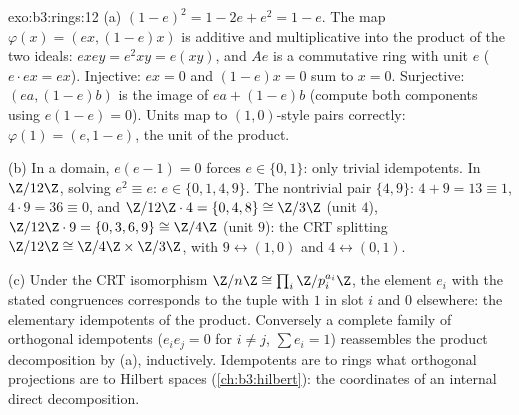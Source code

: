 \begin{solution}{exo:b3:rings:12}
(a) $(1-e)^2 = 1 - 2e + e^2 = 1 - e$. The map $\varphi(x) =
(ex, (1-e)x)$ is additive and multiplicative into the product
of the two ideals: $exey = e^2xy = e(xy)$, and $Ae$ is a
commutative ring with unit $e$ ($e\cdot ex = ex$). Injective:
$ex = 0$ and $(1-e)x = 0$ sum to $x = 0$. Surjective: $(ea,
(1-e)b)$ is the image of $ea + (1-e)b$ (compute both
components using $e(1-e) = 0$). Units map to $(1, 0)$-style
pairs correctly: $\varphi(1) = (e, 1-e)$, the unit of the
product.

(b) In a domain, $e(e - 1) = 0$ forces $e \in \{0, 1\}$: only
trivial idempotents. In $\Z/12\Z$, solving $e^2 \equiv e$: $e
\in \{0, 1, 4, 9\}$. The nontrivial pair $\{4, 9\}$: $4 + 9 =
13 \equiv 1$, $4\cdot9 = 36 \equiv 0$, and $\Z/12\Z\cdot4 =
\{0, 4, 8\} \cong \Z/3\Z$ (unit $4$), $\Z/12\Z\cdot9 = \{0,
3, 6, 9\} \cong \Z/4\Z$ (unit $9$): the CRT splitting
$\Z/12\Z \cong \Z/4\Z\times\Z/3\Z$, with $9 \leftrightarrow
(1, 0)$ and $4 \leftrightarrow (0, 1)$.

(c) Under the CRT isomorphism $\Z/n\Z \cong \prod_i
\Z/p_i^{a_i}\Z$, the element $e_i$ with the stated
congruences corresponds to the tuple with $1$ in slot $i$ and
$0$ elsewhere: the elementary idempotents of the product.
Conversely a complete family of orthogonal idempotents
($e_ie_j = 0$ for $i \neq j$, $\sum e_i = 1$) reassembles the
product decomposition by (a), inductively. Idempotents are to
rings what orthogonal projections are to Hilbert spaces
(\cref{ch:b3:hilbert}): the coordinates of an internal direct
decomposition.
\end{solution}

